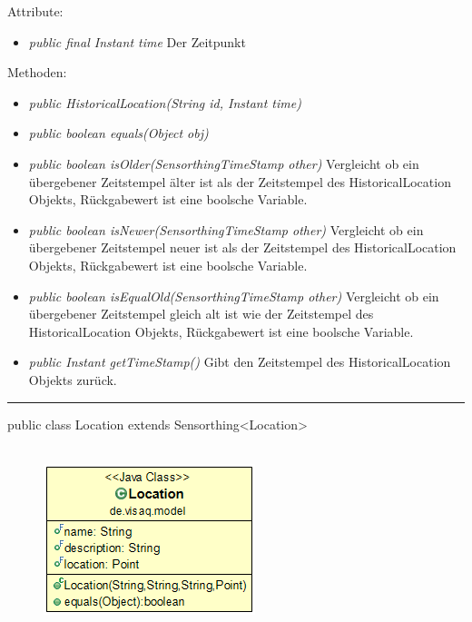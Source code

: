 Attribute:
\begin{itemize}
	\item \emph{public final Instant time} Der Zeitpunkt
\end{itemize}
Methoden:
\begin{itemize}
	\item \emph{public HistoricalLocation(String id, Instant time)} 
	\item \emph{public boolean equals(Object obj)} 
	\item \emph{public boolean isOlder(SensorthingTimeStamp other)} Vergleicht ob ein übergebener Zeitstempel älter ist als der Zeitstempel des HistoricalLocation Objekts, Rückgabewert ist eine boolsche Variable.
	\item \emph{public boolean isNewer(SensorthingTimeStamp other)} Vergleicht ob ein übergebener Zeitstempel neuer ist als der Zeitstempel des HistoricalLocation Objekts, Rückgabewert ist eine boolsche Variable.
	\item \emph{public boolean isEqualOld(SensorthingTimeStamp other)} Vergleicht ob ein übergebener Zeitstempel gleich alt ist wie der Zeitstempel des HistoricalLocation Objekts, Rückgabewert ist eine boolsche Variable.
	\item \emph{public Instant getTimeStamp()} Gibt den Zeitstempel des HistoricalLocation Objekts zurück.
\end{itemize}

\rule{\textwidth}{0.4pt}
public class Location extends Sensorthing<Location>
\\\\
\begin{minipage}{0.3\textwidth}
	\begin{figure}[H]
		\includegraphics[scale = 0.5
		]{media/frontend/model/LocationClass.png}
	\end{figure}
\end{minipage} \hfill
\begin{minipage}{0.6\textwidth}
\end{minipage}

